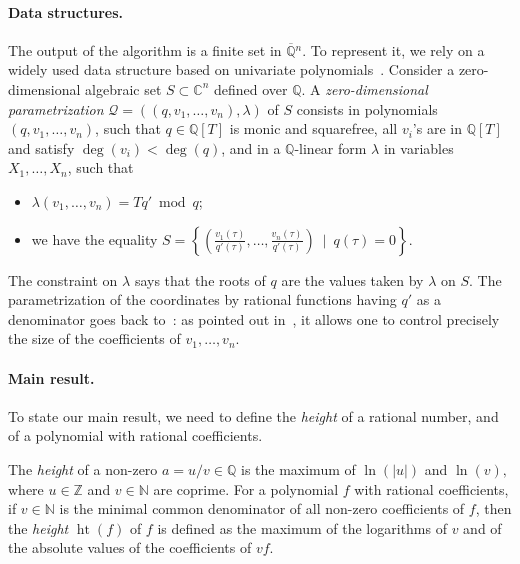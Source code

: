 \documentclass[sigconf]{acmart}
\DeclareMathOperator{\htt}{ht}
\def\C{\mathbb{C}}
\def\Q{\mathbb{Q}}
\def\scrQ{\ensuremath{\mathscr{Q}}}
\begin{document}
\paragraph*{Data structures.} 
The output of the algorithm is a finite set in $\overline{\Q}{}^n$. To
represent it, we rely on a widely used data structure based on
univariate
polynomials~\cite{Kronecker82,Macaulay16,GiMo89,GiHeMoPa95,ABRW,GiHaHeMoMoPa97,GiHeMoMoPa98,Rouillier99}.
Consider a zero-dimensional algebraic set $S \subset \C^n$ defined
over $\Q$. A {\em zero-dimensional parametrization}
$\scrQ=((q,v_1,\dots,v_n),\lambda)$ of $S$ consists in polynomials
$(q,v_1,\dots,v_n)$, such that $q\in \Q[T]$ is monic and squarefree,
all $v_i$'s are in $\Q[T]$ and satisfy $\deg(v_i) < \deg(q)$, and in a
$\Q$-linear form $\lambda$ in variables $X_1,\dots,X_n$, such that
\begin{itemize}
\item $\lambda(v_1,\dots,v_n)=T q' \bmod q$;
\item we have the equality
  $S=\left \{\left(
      \frac{v_1(\tau)}{q'(\tau)},\dots,\frac{v_n(\tau)}{q'(\tau)}\right
    ) \ \mid \ q(\tau)=0 \right \}.$
\end{itemize}
The constraint on $\lambda$ says that the roots of $q$ are the values
taken by $\lambda$ on $S$. The parametrization of the coordinates by
rational functions having $q'$ as a denominator goes back
to~\cite{Kronecker82,Macaulay16}: as pointed out in~\cite{ABRW}, it
allows one to control precisely the size of the coefficients of
$v_1,\dots,v_n$.

\paragraph*{Main result.} To state our main result, we need to define 
the {\em height} of a rational number, and of a polynomial with
rational coefficients.

The {\em height} of a non-zero $a=u/v \in \Q$ is the maximum of
$\ln(|u|)$ and $\ln(v),$ where $u \in \mathbb{Z}$ and $v \in
\mathbb{N}$ are coprime. For a polynomial $f$ with rational
coefficients, if $v \in \mathbb N$ is the minimal common denominator
of all non-zero coefficients of $f$, then the \textit{height}
$\htt(f)$ of $f$ is defined as the maximum of the logarithms of $v$
and of the absolute values of the coefficients of $vf$.
\end{document}
